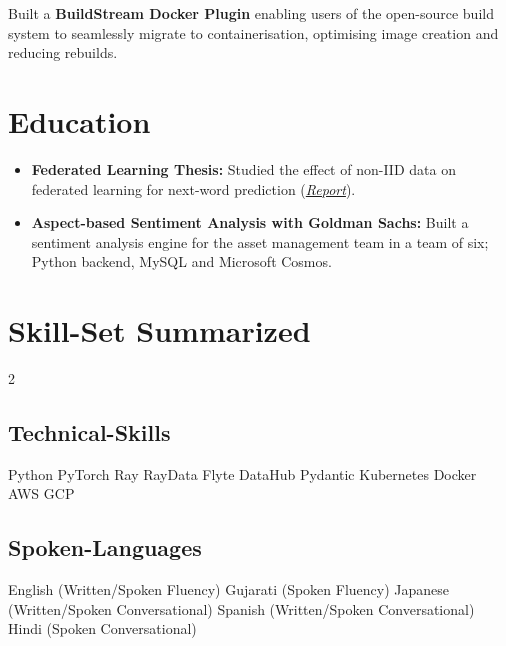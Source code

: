 \documentclass[a4paper]{deedy-resume} %
\begin{document}
\vspace{-3pt}
Built a \textbf{BuildStream Docker Plugin} enabling users of the open-source build system to seamlessly migrate to containerisation, optimising image creation and reducing rebuilds.
\vspace{4pt}
\section{Education}
\vspace{-5pt}
\begin{itemize}
    \item \textbf{Federated Learning Thesis:} Studied the effect of non-IID data on federated learning for next-word prediction (\href{https://shashwatdalal.github.io/files/fl_fyp.pdf}{\textit{Report}}).
    \item \textbf{Aspect-based Sentiment Analysis with Goldman Sachs:} Built a sentiment analysis engine for the asset management team in a team of six; Python backend, MySQL and Microsoft Cosmos.
\end{itemize}
\section{Skill-Set Summarized}
\vspace{-10pt}
\begin{multicols}{2}
    \subsection{Technical-Skills}
    Python
    \textbullet{} PyTorch
    \textbullet{} Ray \textbullet{} RayData
    \textbullet{} Flyte \textbullet{} DataHub \textbullet{} Pydantic
    \textbullet{} Kubernetes \textbullet{} Docker
    \textbullet{} AWS \textbullet{} GCP

    \columnbreak

    \subsection{Spoken-Languages}
    \vspace{-1pt}
    English (Written/Spoken Fluency)
    \textbullet{} Gujarati (Spoken Fluency)
    \textbullet{} Japanese (Written/Spoken Conversational)
    \textbullet{} Spanish (Written/Spoken Conversational)
    \textbullet{} Hindi (Spoken Conversational)
\end{multicols}
\end{document}
